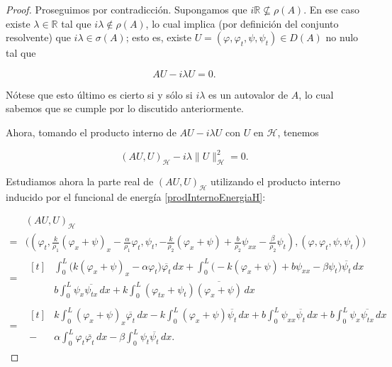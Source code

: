 \begin{proof}
    Proseguimos por contradicción. Supongamos que $i\mathbb{R} \not \subseteq \rho(A)$. En ese caso existe $\lambda \in \mathbb{R}$ tal que $i\lambda \notin \rho(A)$, lo cual implica (por definición del conjunto resolvente) que $i\lambda \in \sigma(A)$; esto es, existe $U = (\varphi, \varphi_t, \psi, \psi_t) \in D(A)$ no nulo tal que

    \[AU - i\lambda U = 0.\]

    Nótese que esto último es cierto si y sólo si $i\lambda$ es un autovalor de $A$, lo cual sabemos que se cumple por lo discutido anteriormente.

    Ahora, tomando el producto interno de $AU - i\lambda U$ con $U$ en $\mathcal{H}$, tenemos

    \[(AU, U)_{\mathcal{H}} - i\lambda \lVert U \rVert^2_{\mathcal{H}} = 0.\]

    Estudiamos ahora la parte real de $(AU, U)_{\mathcal{H}}$ utilizando el producto interno inducido por el funcional de energía \ref{prodInternoEnergiaH}:

    \begin{align*}
        &(AU, U)_{\mathcal{H}}\\
        =& \Bigg(\left(\varphi_t, \frac{k}{\rho_1}(\varphi_x + \psi)_x - \frac{\alpha}{\rho_1}\varphi_t, \psi_t, -\frac{k}{\rho_2}(\varphi_x + \psi) + \frac{b}{\rho_2}\psi_{xx} - \frac{\beta}{\rho_2}\psi_t \right), (\varphi, \varphi_t, \psi, \psi_t)\Bigg)\\
        =& 
        \begin{aligned}[t]
            &\int_0^L \Big(k(\varphi_x + \psi)_x - \alpha\varphi_t\Big)\overline{\varphi_t} \, dx + \int_0^L \Big(-k(\varphi_x + \psi) + b\psi_{xx} - \beta\psi_t \Big)\overline{\psi_t} \, dx\\
            &b\int_0^L \psi_x \overline{\psi_{tx}} \, dx + k\int_0^L (\varphi_{tx} + \psi_t)\overline{(\varphi_x + \psi)} \, dx 
        \end{aligned}\\
        =&
        \begin{aligned}[t]
            &k\int_0^L(\varphi_x + \psi)_x\overline{\varphi_t} \, dx - k\int_0^L(\varphi_x + \psi) \overline{\psi_t} \, dx + b\int_0^L\psi_{xx}\overline{\psi_t} \, dx + b\int_0^L \psi_x \overline{\psi_{tx}} \, dx\\
            -&\alpha \int_0^L \varphi_t \overline{\varphi_t}\, dx - \beta\int_0^L \psi_t \overline{\psi_t} \, dx.
        \end{aligned}
    \end{align*}


\end{proof}
